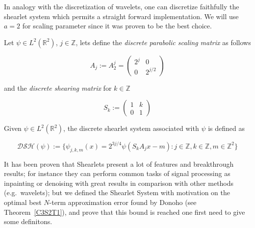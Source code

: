 In analogy with the discretization of wavelets, one can discretize faithfully the shearlet system which permits a straight forward implementation. We will use $a=2$ for scaling parameter since it was proven to be the best choice.

\begin{defn}
Let $\psi\in L^2(\mathbb{R}^2)$, $j\in\mathbb{Z}$, lets define the \textit{discrete parabolic scaling matrix} as follows

\begin{equation}
\label{eq:discscaling}
A_j:= A_2^j =
\left(\begin{matrix}
2^j & 0 \\
0 & 2^{j/2}
\end{matrix}\right)
\end{equation}

and the \textit{discrete shearing matrix} for $k\in\mathbb{Z}$

\begin{equation}
\label{eq:discshearing}
S_k:= 
\left(\begin{matrix}
1 & k \\
0 & 1
\end{matrix}\right) 
\end{equation}

Given $\psi\in L^2(\mathbb{R}^2)$, the discrete shearlet system associated with $\psi$ is defined as

\begin{equation}
\label{eq:discshearletsys}
\mathcal{DSH}(\psi):=\{\psi_{j,k,m}(x)=2^{3j/4}\psi (S_kA_jx-m):j\in\mathbb{Z},k\in\mathbb{Z},m\in\mathbb{Z}^2\}
\end{equation}
\end{defn}

It has been proven that Shearlets present a lot of features and breakthrough results; for instance they can perform common tasks of signal processing as inpainting or denoising with great results in comparison with other methods (e.g.\ wavelets); but we defined the Shearlet System with motivation on the optimal best $N$-term approximation error found by Donoho (see Theorem~\ref{C3S2T1}), and prove that this bound is reached one first need to give some definitons.

